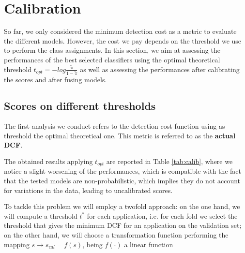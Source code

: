 \section{Calibration}\label{sec_calib}
So far, we only considered the minimum detection cost as a metric to evaluate the different models. However, the cost we pay depends on the threshold we use to perform the class assignments. In this section, we aim at assessing the performances of the best selected classifiers using the optimal theoretical threshold $t_{opt} = - log \frac{\tilde{\pi}}{1-\tilde{\pi}}$ as well as assessing the performances after calibrating the scores and after fusing models.

\subsection{Scores on different thresholds}
The first analysis we conduct refers to the detection cost function using as threshold the optimal theoretical one. This metric is referred to as the \textbf{actual DCF}.

 The obtained results applying $t_{opt}$ are reported in Table \ref{tab:calib}, where we notice a slight worsening of the performances, which is compatible with the fact that the tested models are non-probabilistic, which implies they do not account for variations in the data, leading to uncalibrated scores.

\noindent
\begin{table}[H]
	\caption{minimum and actual DCF for the best performing models}
	\label{tab:calib}
\end{table}

To tackle this problem we will employ a twofold approach: on the one hand, we will compute a threshold $t^*$ for each application, i.e. for each fold we select the threshold that gives the minimum DCF for an
application on the validation set; on the other hand, we will choose a transformation function performing the mapping $s \to s_{cal} = f(s)$, being $f(\cdot)$ a linear function

